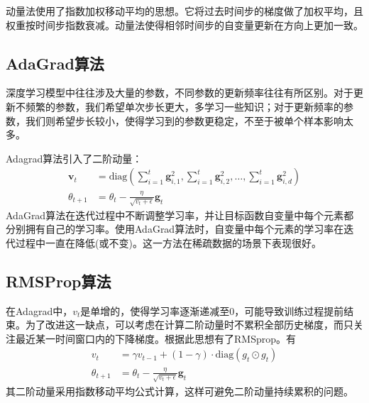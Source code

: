 动量法使用了指数加权移动平均的思想。它将过去时间步的梯度做了加权平均，且权重按时间步指数衰减。动量法使得相邻时间步的自变量更新在方向上更加一致。
\subsection{AdaGrad算法}
深度学习模型中往往涉及大量的参数，不同参数的更新频率往往有所区别。对于更新不频繁的参数，我们希望单次步长更大，多学习一些知识；对于更新频率的参数，我们则希望步长较小，使得学习到的参数更稳定，不至于被单个样本影响太多。

Adagrad算法引入了二阶动量：
\begin{equation}
	\begin{aligned}
		\boldsymbol{v}_t&=\mathrm{diag}(\sum_{i=1}^{t}\boldsymbol{g}_{i,1}^2, \sum_{i=1}^{t}\boldsymbol{g}_{i,2}^2, \dots, \sum_{i=1}^{t}\boldsymbol{g}_{i,d}^2)\\
		\theta_{t+1} &= \theta_{t} - \frac{\eta}{\sqrt{v_t + \epsilon}}\boldsymbol{g}_t
	\end{aligned}
\end{equation}
AdaGrad算法在迭代过程中不断调整学习率，并让目标函数自变量中每个元素都分别拥有自己的学习率。使用AdaGrad算法时，自变量中每个元素的学习率在迭代过程中一直在降低(或不变)。这一方法在稀疏数据的场景下表现很好。
\subsection{RMSProp算法}
在Adagrad中，$v_t$是单增的，使得学习率逐渐递减至0，可能导致训练过程提前结束。为了改进这一缺点，可以考虑在计算二阶动量时不累积全部历史梯度，而只关注最近某一时间窗口内的下降梯度。根据此思想有了RMSprop。有
\begin{equation}
	\begin{aligned}
		v_t &= \gamma v_{t-1} + (1-\gamma)\cdot \mathrm{diag}(g_t \odot g_t)\\
		\theta_{t+1} &= \theta_{t} - \frac{\eta}{\sqrt{v_t + \epsilon}}\boldsymbol{g}_t
	\end{aligned}
\end{equation}
其二阶动量采用指数移动平均公式计算，这样可避免二阶动量持续累积的问题。
